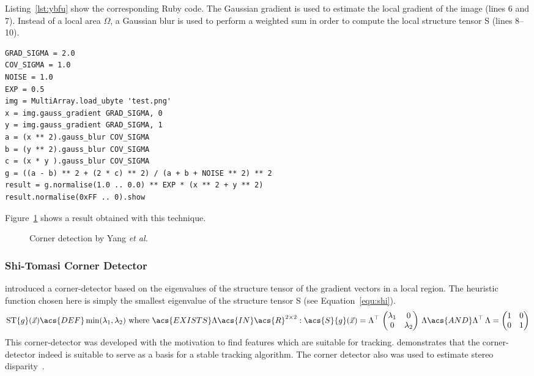 \documentclass[12pt,a4paper,oneside,openright]{book}
\newcommand{\equ}[1]{Equation~\ref{equ:#1}}
\newcommand{\fig}[1]{Figure~\ref{fig:#1}}
\newcommand{\lst}[1]{Listing~\ref{lst:#1}}
\begin{document}
\begin{CJK}{UTF8}{}
\lst{ybfu} show the corresponding Ruby code. The Gaussian gradient is used to estimate the local gradient of the image (lines 6 and 7). Instead of a local area $\Omega$, a Gaussian blur is used to perform a weighted sum in order to compute the local structure tensor \acs{S} (lines 8--10).
\lstset{language=Ruby,frame=single,numbers=left}
\begin{lstlisting}[float,caption={Yang \emph{et al.} corner detector},escapechar=\$,label=lst:ybfu]
GRAD_SIGMA = 2.0
COV_SIGMA = 1.0
NOISE = 1.0
EXP = 0.5
img = MultiArray.load_ubyte 'test.png'
x = img.gauss_gradient GRAD_SIGMA, 0
y = img.gauss_gradient GRAD_SIGMA, 1
a = (x ** 2).gauss_blur COV_SIGMA
b = (y ** 2).gauss_blur COV_SIGMA
c = (x * y ).gauss_blur COV_SIGMA
g = ((a - b) ** 2 + (2 * c) ** 2) / (a + b + NOISE ** 2) ** 2
result = g.normalise(1.0 .. 0.0) ** EXP * (x ** 2 + y ** 2)
result.normalise(0xFF .. 0).show
\end{lstlisting}
\fig{ybfu} shows a result obtained with this technique.
\begin{figure}[htbp]
   \begin{center}
     \begin{minipage}[c]{.45\textwidth}
     \end{minipage}
     \begin{minipage}[c]{.45\textwidth}
       \resizebox{\textwidth}{!}{\texttt{[image: y\_b\_f\_u]}}
     \end{minipage}
     \caption{Corner detection by Yang \emph{et al.}\label{fig:ybfu}}
   \end{center}
\end{figure}

\subsubsection{Shi-Tomasi Corner Detector}
\citet{RefWorks:355} introduced a corner-detector based on the eigenvalues of the structure tensor of the gradient vectors in a local region. The heuristic function chosen here is simply the smallest eigenvalue of the structure tensor \acs{S} (see \equ{shi}).
\begin{equation}\label{equ:shi}
  \operatorname{ST}\{g\}(\vec{x})\acs{DEF}\operatorname{min}(\lambda_1,\lambda_2)\mathrm{\ where\ }
  \acs{EXISTS}\Lambda\acs{IN}\acs{R}^{2\times 2}:\acs{S}\{g\}(\vec{x})=\Lambda^\top\,\begin{pmatrix}\lambda_1&0\\0&\lambda_2\end{pmatrix}\,\Lambda\acs{AND}\Lambda^\top\,\Lambda=\begin{pmatrix}1&0\\0&1\end{pmatrix}
\end{equation}
This corner-detector was developed with the motivation to find features which are suitable for tracking. \citet{RefWorks:354} demonstrates that the corner-detector indeed is suitable to serve as a basis for a stable tracking algorithm. The corner detector also was used to estimate stereo disparity~\citep{RefWorks:353}.


\end{CJK}
\end{document}
